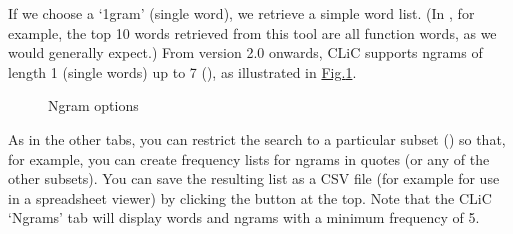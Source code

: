 \documentclass[letterpaper,10pt,english]{sphinxmanual}
\begin{document}
\sphinxAtStartPar
If we choose a
‘1\sphinxhyphen{}gram’ (single word), we retrieve a simple word list. (In , for example, the top 10 words retrieved from this tool are  \textendash{} all function words, as we would
generally expect.) From version 2.0 onwards, CLiC supports n\sphinxhyphen{}grams of
length 1 (single words) up to 7 (), as
illustrated in \hyperref[\detokenize{clicanalysis/ngrams:figure-analysis-ngrams}]{Fig.\@ \ref{\detokenize{clicanalysis/ngrams:figure-analysis-ngrams}}}.

\begin{figure}[htbp]
\centering
\capstart

\noindent{}
\caption{N\sphinxhyphen{}gram options}\label{\detokenize{clicanalysis/ngrams:id1}}\label{\detokenize{clicanalysis/ngrams:figure-analysis-ngrams}}\end{figure}

\sphinxAtStartPar
As in the other tabs, you can restrict the search to a particular subset
() so that, for example, you can
create frequency lists for n\sphinxhyphen{}grams in quotes (or any of the other
subsets). You can save the resulting list as a CSV file (for example for
use in a spreadsheet viewer) by clicking the  button at the
top. Note that the CLiC ‘N\sphinxhyphen{}grams’ tab will display words and n\sphinxhyphen{}grams
with a minimum frequency of 5.

\sphinxstepscope
\end{document}
